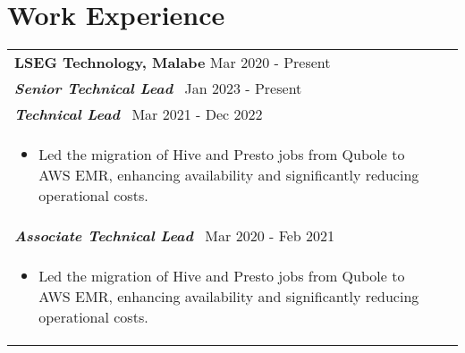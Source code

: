 \documentclass[a4paper,8pt]{article}
\begin{document}
\section{Work Experience}
\begin{tabularx}{\linewidth}{ @{}l r@{} }
  \textbf{{LSEG Technology, Malabe}} \hfill \color[HTML]{371e77} Mar 2020 - Present \\[4pt]
  
  \color[HTML]{371e77}\textbf{\textit{Senior Technical Lead}}\ \hfill \color[HTML]{4B28A4} Jan 2023 - Present \\[5pt]
  
  \color[HTML]{371e77}\textbf{\textit{Technical Lead}}\ \hfill \color[HTML]{4B28A4} Mar 2021 - Dec 2022 \\[5pt]
  \begin{minipage}[t]{\linewidth}
      \begin{itemize}[nosep,after=\strut, leftmargin=2em, itemsep=2pt]
          \item Led the migration of Hive and Presto jobs from Qubole to AWS EMR, enhancing availability and significantly reducing operational costs.
      \end{itemize}
  \end{minipage} \\[10pt]
  
  \color[HTML]{371e77}\textbf{\textit{Associate Technical Lead}}\ \hfill \color[HTML]{4B28A4} Mar 2020 - Feb 2021 \\[5pt]
  \begin{minipage}[t]{\linewidth}
      \begin{itemize}[nosep,after=\strut, leftmargin=2em, itemsep=2pt]
          \item Led the migration of Hive and Presto jobs from Qubole to AWS EMR, enhancing availability and significantly reducing operational costs.
      \end{itemize}
  \end{minipage}
  \end{tabularx}
\end{document}
